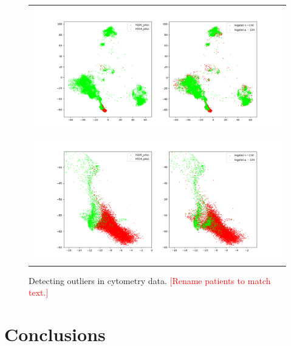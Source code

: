 \begin{figure}[!htb]
  \centering
  \begin{tabular}{c}
    \includegraphics[width=\textwidth]{images/scored.png} \\
    \includegraphics[width=\textwidth]{images/scored_zoomed.png}
  \end{tabular}
  \caption{Detecting outliers in cytometry data. \textcolor{red}{[Rename patients to match text.]}}
  \label{fig:cytometry_outliers}
\end{figure}

\chapter{Conclusions}
\label{ch:conclusions}

